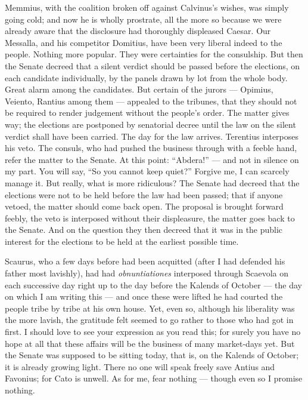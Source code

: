  Memmius, with the coalition broken off against Calvinus's wishes, was simply going cold; and now he is wholly prostrate, all the more so because we were already aware that the disclosure had thoroughly displeased Caesar. Our Messalla, and his competitor Domitius, have been very liberal indeed to the people. Nothing more popular. They were certainties for the consulship. But then the Senate decreed that a silent verdict should be passed before the elections, on each candidate individually, by the panels drawn by lot from the whole body. Great alarm among the candidates. But certain of the jurors --- Opimius, Veiento, Rantius among them --- appealed to the tribunes, that they should not be required to render judgement without the people's order. The matter gives way; the elections are postponed by senatorial decree until the law on the silent verdict shall have been carried. The day for the law arrives. Terentius interposes his veto. The consuls, who had pushed the business through with a feeble hand, refer the matter to the Senate. At this point: ``Abdera!'' --- and not in silence on my part. You will say, ``So you cannot keep quiet?'' Forgive me, I can scarcely manage it. But really, what is more ridiculous? The Senate had decreed that the elections were not to be held before the law had been passed; that if anyone vetoed, the matter should come back open. The proposal is brought forward feebly, the veto is interposed without their displeasure, the matter goes back to the Senate. And on the question they then decreed that it was in the public interest for the elections to be held at the earliest possible time.

 Scaurus, who a few days before had been acquitted (after I had defended his father most lavishly), had had \textit{obnuntiationes} interposed through Scaevola on each successive day right up to the day before the Kalends of October --- the day on which I am writing this --- and once these were lifted he had courted the people tribe by tribe at his own house. Yet, even so, although his liberality was the more lavish, the gratitude felt seemed to go rather to those who had got in first. I should love to see your expression as you read this; for surely you have no hope at all that these affairs will be the business of many market-days yet. But the Senate was supposed to be sitting today, that is, on the Kalends of October; it is already growing light. There no one will speak freely save Antius and Favonius; for Cato is unwell. As for me, fear nothing --- though even so I promise nothing.

